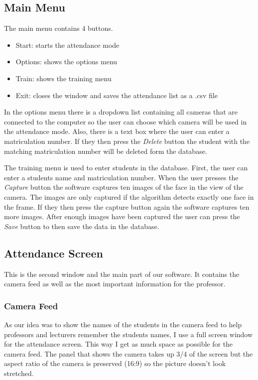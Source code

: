\documentclass[12pt, a4paper]{article}
\begin{document}
\subsection{Main Menu}
The main menu contains 4 buttons.
\begin{itemize}
\item Start: starts the attendance mode
\item Options: shows the options menu
\item Train: shows the training menu
\item Exit: closes the window and saves the attendance list as a .csv file
\end{itemize}

In the options menu there is a dropdown list containing all cameras that are connected to the computer so the user can choose which camera will be used in the attendance mode. Also, there is a text box where the user can enter a matriculation number. If they then press the \textit{Delete} button the student with the matching matriculation number will be deleted form the database. 

The training menu is used to enter students in the database. First, the user can enter a students name and matriculation number.  When the user presses the \textit{Capture} button the software captures ten images of the face in the view of the camera. The images are only captured if the algorithm detects exactly one face in the frame. If they then press the capture button again the software captures ten more images. After enough images have been captured the user can press the \textit{Save} button to then save the data in the database. 

\subsection{Attendance Screen}
This is the second window and the main part of our software. It contains the camera feed as well as the most important information for the professor.

\subsubsection{Camera Feed}
As our idea was to show the names of the students in the camera feed to help professors and lecturers remember the students names, I use a full screen window for the attendance screen. This way I get as much space as possible for the camera feed. The panel that shows the camera takes up 3/4 of the screen but the aspect ratio of the camera is preserved (16:9) so the picture doesn’t look stretched.
 
\end{document}
